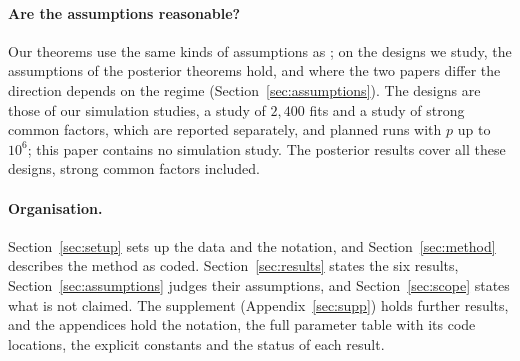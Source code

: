 \paragraph{Are the assumptions reasonable?} Our theorems use the same kinds of assumptions as \citet{SongLiang2015}; on
the designs we study, the assumptions of the posterior theorems hold, and where the two papers differ the direction
depends on the regime (Section~\ref{sec:assumptions}). The designs are those of our simulation studies, a study of
$2{,}400$ fits and a study of strong common factors, which are reported separately, and planned runs with $p$ up to
$10^6$; this paper contains no simulation study. The posterior results cover all these designs, strong common factors
included.

\paragraph{Organisation.} Section~\ref{sec:setup} sets up the data and the notation, and Section~\ref{sec:method}
describes the method as coded. Section~\ref{sec:results} states the six results, Section~\ref{sec:assumptions} judges
their assumptions, and Section~\ref{sec:scope} states what is not claimed. The supplement (Appendix~\ref{sec:supp})
holds further results, and the appendices hold the notation, the full parameter table with its code locations, the
explicit constants and the status of each result.
